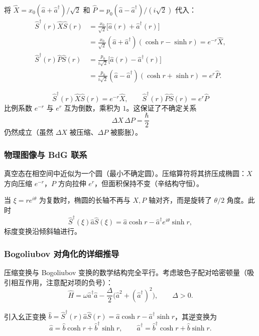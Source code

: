 将 $\hat{X} = x_0(\hat{a}+\hat{a}^\dagger)/\sqrt{2}$ 和 $\hat{P} = p_0(\hat{a}-\hat{a}^\dagger)/(i\sqrt{2})$ 代入：
\begin{align*}
\hat{S}^\dagger(r)\hat{X}\hat{S}(r)
&= \frac{x_0}{\sqrt{2}}\bigl[\hat{a}(r)+\hat{a}^\dagger(r)\bigr] \\
&= \frac{x_0}{\sqrt{2}}(\hat{a}+\hat{a}^\dagger)(\cosh r - \sinh r)
= e^{-r}\hat{X}, \\
\hat{S}^\dagger(r)\hat{P}\hat{S}(r)
&= \frac{p_0}{i\sqrt{2}}\bigl[\hat{a}(r)-\hat{a}^\dagger(r)\bigr] \\
&= \frac{p_0}{i\sqrt{2}}(\hat{a}-\hat{a}^\dagger)(\cosh r + \sinh r)
= e^{r}\hat{P}.
\end{align*}

\begin{formulabox}[压缩算符的核心结论]
\[
\boxed{\hat{S}^\dagger(r)\hat{X}\hat{S}(r) = e^{-r}\hat{X},
\qquad
\hat{S}^\dagger(r)\hat{P}\hat{S}(r) = e^{r}\hat{P}}
\]
比例系数 $e^{-r}$ 与 $e^{r}$ 互为倒数，乘积为 $1$。这保证了不确定关系
\[
\Delta X\,\Delta P = \frac{\hbar}{2}
\]
仍然成立（虽然 $\Delta X$ 被压缩、$\Delta P$ 被膨胀）。
\end{formulabox}

\subsubsection{物理图像与 BdG 联系}

\begin{insightbox}
真空态在相空间中近似为一个圆（最小不确定圆）。压缩算符将其挤压成椭圆：$X$ 方向压缩 $e^{-r}$，$P$ 方向拉伸 $e^{r}$，但面积保持不变（辛结构守恒）。

当 $\xi=re^{i\theta}$ 为复数时，椭圆的长轴不再与 $X,P$ 轴对齐，而是旋转了 $\theta/2$ 角度。此时
\[
\hat{S}^\dagger(\xi)\hat{a}\hat{S}(\xi)
= \hat{a}\cosh r - \hat{a}^\dagger e^{i\theta}\sinh r,
\]
标度变换沿倾斜轴进行。
\end{insightbox}

\subsubsection{Bogoliubov 对角化的详细推导}

压缩变换与 Bogoliubov 变换的数学结构完全平行。考虑玻色子配对哈密顿量（吸引相互作用，注意配对项的负号）：
\[
\hat{H} = \omega\hat{a}^\dagger\hat{a} - \frac{\Delta}{2}\bigl(\hat{a}^2 + (\hat{a}^\dagger)^2\bigr),
\qquad \Delta>0.
\]

引入幺正变换 $\hat{b} = \hat{S}^\dagger(r)\hat{a}\hat{S}(r) = \hat{a}\cosh r - \hat{a}^\dagger\sinh r$，其逆变换为
\[
\hat{a} = \hat{b}\cosh r + \hat{b}^\dagger\sinh r,
\qquad
\hat{a}^\dagger = \hat{b}^\dagger\cosh r + \hat{b}\sinh r.
\]


